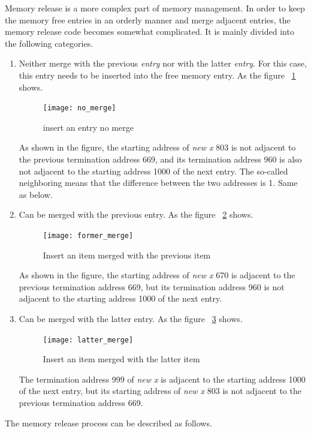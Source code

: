 \documentclass{swfcthesis}
\begin{document}
Memory release is a more complex part of memory management. In order to keep the memory
free entries in an orderly manner and merge adjacent entries, the memory release code
becomes somewhat complicated. It is mainly divided into the following categories.
\begin{enumerate}
\item Neither merge with the previous \emph{entry} nor with the latter \emph{entry}. For
  this case, this entry needs to be inserted into the free memory entry. As the figure
  ~\ref{fig:no-merge} shows.
  \begin{figure}[!ht]
    \centering
    \texttt{[image: no\_merge]}
    \caption{insert an entry no merge}
    \label{fig:no-merge}
  \end{figure}
  As shown in the figure, the starting address of \emph{new x} 803 is not adjacent to
  the previous termination address 669, and its termination address 960 is also not
  adjacent to the starting address 1000 of the next entry. The so-called neighboring means
  that the difference between the two addresses is 1. Same as below.

\item Can be merged with the previous entry. As the figure ~\ref{fig:former-merge} shows.
  \begin{figure}[!ht]
    \centering
    \texttt{[image: former\_merge]}
    \caption{Insert an item merged with the previous item}
    \label{fig:former-merge}
  \end{figure}
  As shown in the figure, the starting address of \emph{new x} 670 is adjacent to the
  previous termination address 669, but its termination address 960 is not adjacent to the
  starting address 1000 of the next entry.


\item Can be merged with the latter entry. As the figure ~\ref{fig:latter-merge} shows.
  \begin{figure}[!ht]
    \centering
    \texttt{[image: latter\_merge]}
    \caption{Insert an item merged with the latter item}
    \label{fig:latter-merge}
  \end{figure}
  The termination address 999 of \emph{new x} is adjacent to the starting address 1000
  of the next entry, but its starting address of \emph{new x} 803 is not adjacent to the
  previous termination address 669.
  
\end{enumerate}
The memory release process can be described as follows.
\end{document}
